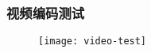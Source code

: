 % 
% 
\begin{frame}[fragile]
    \frametitle{视频编码测试}
    \begin{figure}
    \texttt{[image: video-test]}
    \end{figure}

\end{frame}
% 

